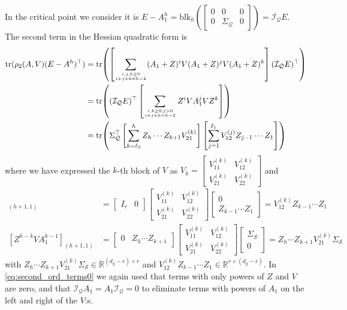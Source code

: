 \documentclass{article}
\makeatletter
\renewenvironment{proof}[1][\proofname]{
  \par\pushQED{\qed}\normalfont
  \topsep6\p@\@plus6\p@\relax
  \trivlist\item[\hskip\labelsep\bfseries#1\@addpunct{.}]
  \ignorespaces
}{
  \popQED\endtrivlist\@endpefalse
}
\def\tr{{\rm tr}}
\newcommand{\1}{\mathds{1}}
\makeatother
\begin{document}
\begin{proof}
    In the critical point we consider it is $E-A_1^h = \text{blk}_h\left(\begin{bmatrix}
	0 & 0 & 0 \\ 0 & \Sigma_\mathcal{Q} & 0
    \end{bmatrix}\right) = \mathcal{I_Q}E$. The second term in the Hessian quadratic form is
    \begin{align}
    	\tr{(\rho_2(A,V)(E - A^h)^\top)} & = \tr{ \left( \left[ \sum_{i,j,k\geq 0 \atop i+j+k=h-2} (A_1 + Z)^{i} V (A_1 + Z)^{j}V (A_1 + Z)^k \right] (\mathcal{I_Q} E )^\top \right)} \nonumber \\
    	&= \tr{ \left( (\mathcal{I_Q} E )^\top \left[ \sum_{i,k\geq 0; j> 0 \atop i+j+k=h-2} Z^{i} V A_1^{j} V Z^k \right]   \right)}\label{eq:second_ord_terms0} \\
    	& = \tr{ \left( \Sigma_\mathcal{Q}^\top \left[ \sum_{k=\ell_3}^{h} Z_h \cdots Z_{k+1} V^{(k)}_{21} \right]\left[ \sum_{j=1}^{\ell_1} V^{(j)}_{12} Z_{j-1}\cdots Z_{1} \right]  \right)} \label{eq:second_ord_terms}
    \end{align}
    where we have expressed the $k$-th block of $V$ as $V_k=\begin{bmatrix}
    	V^{(k)}_{11} & V^{(k)}_{12} \\ V^{(k)}_{21} & V^{(k)}_{22}
    \end{bmatrix}$
    and
    \begin{align*}
    	[A_1^{h-k} V Z^{k-1}]_{(h+1,1)} &= \begin{bmatrix}
    		I_r & 0 
    	\end{bmatrix}\begin{bmatrix}
    	V^{(k)}_{11} & V^{(k)}_{12} \\ V^{(k)}_{21} & V^{(k)}_{22}
    	\end{bmatrix}
    	\begin{bmatrix}
    		0 \\  Z_{k-1}\cdots Z_1
    	\end{bmatrix} = V^{(k)}_{12} Z_{k-1}\cdots Z_1 \\
    	[Z^{h-k} V A_1^{k-1}]_{(h+1,1)} &= \begin{bmatrix}
    		0 & Z_{h}\cdots Z_{k+1}
    	\end{bmatrix}\begin{bmatrix}
    		V^{(k)}_{11} & V^{(k)}_{12} \\ V^{(k)}_{21} & V^{(k)}_{22}
    	\end{bmatrix}
    	\begin{bmatrix}
    		\Sigma_\mathcal{S} \\ 0 
    	\end{bmatrix} =Z_{h}\cdots Z_{k+1}V^{(k)}_{21}\Sigma_\mathcal{S} 
    \end{align*}
    with $Z_{h}\cdots Z_{k+1} V^{(k)}_{21} \Sigma_\mathcal{S} \in \mathbb{R}^{(d_y-r)\times r}$ and $V^{(k)}_{12} Z_{k-1}\cdots Z_1 \in \mathbb{R}^{r\times (d_y-r)}$. In \eqref{eq:second_ord_terms0} we again used that terms with only powers of $Z$ and $V$ are zero, and that $\mathcal{I_Q}A_1 = A_1 \mathcal{I_Q}= 0$ to eliminate terms with powers of $A_1$ on the left and right of the $V$:s.


\end{proof}
\end{document}
